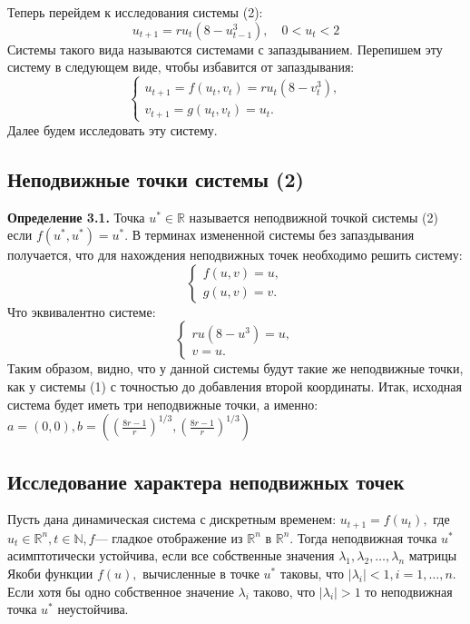 \documentclass[11pt]{article}
\begin{document}
	{Теперь перейдем к исследования системы (2):}
	\[ u_{t+1} = ru_t(8 - u_{t-1}^3), \quad 0 < u_t < 2 \]
	{Системы такого вида называются системами с запаздыванием. Перепишем эту систему в следующем виде, чтобы избавится от запаздывания:}
	\[\begin{cases}
	u_{t+1} = f(u_t,v_t) = ru_t(8 - v_t^3),\\
	v_{t + 1} = g(u_t, v_t) = u_t.
	\end{cases} \]
	{Далее будем исследовать эту систему.}
	\newline
	{\subsection{Неподвижные точки системы (2)}}
	{\textbf{Определение 3.1.} Точка $u^* \in \mathds{R}$ называется неподвижной точкой системы (2) если $f(u^*, u^*) = u^*.$}
	\newline
	{В терминах измененной системы без запаздывания получается, что для нахождения неподвижных точек необходимо решить систему:}
	\[ \begin{cases}
	f(u, v) = u,\\
	g(u,v) = v.
	\end{cases} \]
	{Что эквивалентно системе:}
	\[\begin{cases}
	 ru(8 - u^3) = u,\\
	 v = u.
	\end{cases} \]
	{Таким образом, видно, что у данной системы будут такие же неподвижные точки, как у системы (1) с точностью до добавления второй координаты. Итак, исходная система будет иметь три неподвижные точки, а именно: $a = (0,0), b = ((\frac{8r - 1}{r})^{1/3}, (\frac{8r - 1}{r})^{1/3})$}
	\newline
	{\subsection{Исследование характера неподвижных точек}}
		\begin{theorem}
		{ Пусть дана динамическая система с дискретным временем: $u_{t + 1} = f(u_t),$ где $u_t \in \mathds{R}^n, t \in \mathds{N}, f$--- гладкое отображение из $\mathds{R}^n$ в $\mathds{R}^n$. Тогда неподвижная точка $u^*$ асимптотически устойчива, если все собственные значения $\lambda_1, \lambda_2, \ldots, \lambda_n$ матрицы Якоби функции $f(u),$ вычисленные в точке $u^*$ таковы, что $|\lambda_i| < 1, i =1,\ldots,n.$ Если хотя бы одно собственное значение $\lambda_i$ таково, что $|\lambda_i| > 1$ то неподвижная точка $u^*$ неустойчива.}
	\end{theorem}
\end{document}
